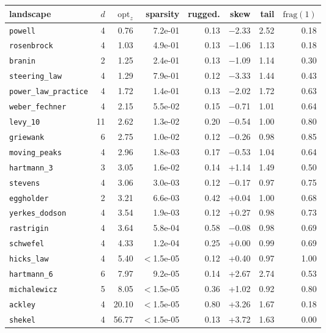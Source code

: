 \begin{tabular}{lrrrrrrr}
\toprule
landscape & $d$ & $\mathrm{opt}_z$ & sparsity & rugged. & skew & tail & $\mathrm{frag}(1)$ \\
\midrule
\texttt{powell} & 4 & 0.76 & 7.2e-01 & 0.13 & $-$2.33 & 2.52 & 0.18 \\
\texttt{rosenbrock} & 4 & 1.03 & 4.9e-01 & 0.13 & $-$1.06 & 1.13 & 0.18 \\
\texttt{branin} & 2 & 1.25 & 2.4e-01 & 0.13 & $-$1.09 & 1.14 & 0.30 \\
\texttt{steering\_law} & 4 & 1.29 & 7.9e-01 & 0.12 & $-$3.33 & 1.44 & 0.43 \\
\texttt{power\_law\_practice} & 4 & 1.72 & 1.4e-01 & 0.13 & $-$2.02 & 1.72 & 0.63 \\
\texttt{weber\_fechner} & 4 & 2.15 & 5.5e-02 & 0.15 & $-$0.71 & 1.01 & 0.64 \\
\texttt{levy\_10} & 11 & 2.62 & 1.3e-02 & 0.20 & $-$0.54 & 1.00 & 0.80 \\
\texttt{griewank} & 6 & 2.75 & 1.0e-02 & 0.12 & $-$0.26 & 0.98 & 0.85 \\
\texttt{moving\_peaks} & 4 & 2.96 & 1.8e-03 & 0.17 & $-$0.53 & 1.04 & 0.64 \\
\texttt{hartmann\_3} & 3 & 3.05 & 1.6e-02 & 0.14 & +1.14 & 1.49 & 0.50 \\
\texttt{stevens} & 4 & 3.06 & 3.0e-03 & 0.12 & $-$0.17 & 0.97 & 0.75 \\
\texttt{eggholder} & 2 & 3.21 & 6.6e-03 & 0.42 & +0.04 & 1.00 & 0.68 \\
\texttt{yerkes\_dodson} & 4 & 3.54 & 1.9e-03 & 0.12 & +0.27 & 0.98 & 0.73 \\
\texttt{rastrigin} & 4 & 3.64 & 5.8e-04 & 0.58 & $-$0.08 & 0.98 & 0.69 \\
\texttt{schwefel} & 4 & 4.33 & 1.2e-04 & 0.25 & +0.00 & 0.99 & 0.69 \\
\texttt{hicks\_law} & 4 & 5.40 & $<$1.5e-05 & 0.12 & +0.40 & 0.97 & 1.00 \\
\texttt{hartmann\_6} & 6 & 7.97 & 9.2e-05 & 0.14 & +2.67 & 2.74 & 0.53 \\
\texttt{michalewicz} & 5 & 8.05 & $<$1.5e-05 & 0.36 & +1.02 & 0.92 & 0.80 \\
\texttt{ackley} & 4 & 20.10 & $<$1.5e-05 & 0.80 & +3.26 & 1.67 & 0.18 \\
\texttt{shekel} & 4 & 56.77 & $<$1.5e-05 & 0.13 & +3.72 & 1.63 & 0.00 \\
\bottomrule
\end{tabular}
